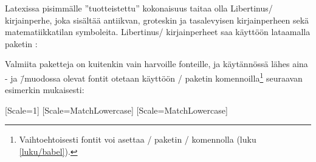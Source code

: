 Latexissa pisimmälle ''tuotteistettu'' kokonaisuus taitaa olla
Libertinus\-/ kirjainperhe, joka sisältää antiikvan, groteskin ja
tasalevyisen kirjainperheen sekä matematiikkatilan symboleita.
Libertinus\-/ kirjainperheet saa käyttöön lataamalla paketin
:

\begin{koodilohkosis}
\usepackage{libertinus}
\end{koodilohkosis}

\noindent
Valmiita paketteja on kuitenkin vain harvoille fonteille, ja käytännössä
lähes aina - ja  \=/muodossa
olevat fontit otetaan käyttöön \-/ paketin
komennoilla\footnote{Vaihtoehtoisesti fontit voi asettaa
  \-/ paketin \-/ komennolla (luku
  \ref{luku/babel}).} seuraavan esimerkin mukaisesti:

\begin{koodilohkosis}
\setmainfont{TeX Gyre Termes}[Scale=1]
\setsansfont{TeX Gyre Heros} [Scale=MatchLowercase]
\setmonofont{TeX Gyre Cursor}[Scale=MatchLowercase]
\end{koodilohkosis}

